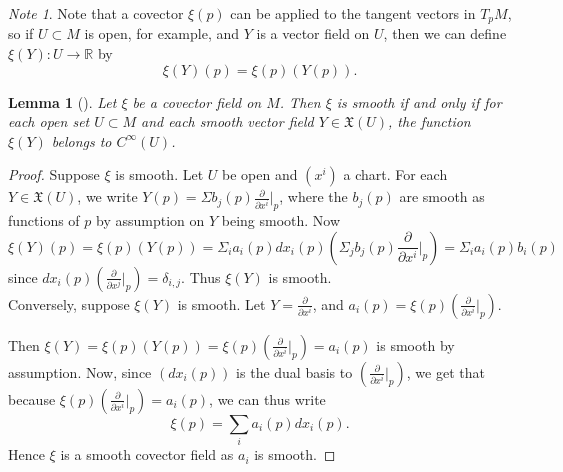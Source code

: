 \documentclass[reqno]{amsart}
\newtheorem{lemma}[theorem]{Lemma}
\theoremstyle{definition}
\theoremstyle{remark}
\newtheorem*{note}{Note}
\begin{document}
      \begin{note}
          Note that a covector $\xi(p)$ can be applied to
          the tangent vectors in $T_pM$, so
          if $U \subset M$ is open, for example, and
          $Y$ is a vector field on $U$, then
          we can define
          $\xi (Y) \colon U \to \mathbb{R}$ by
          \[
          \xi(Y) (p) = \xi(p) \left( Y(p) \right) .
          \] 
      \end{note}

      \begin{lemma}[]
          Let $\xi$ be a covector field on $M$. Then
          $\xi$ is smooth if and only if
          for each open set $U \subset M$ and each smooth
          vector field $Y \in \mathfrak{X}(U)$, the
          function $\xi (Y)$ belongs to $C^{\infty}(U)$.
      \end{lemma}

      \begin{proof}
          Suppose
          $\xi$ is smooth. Let $U$ be open and
          $(x^{i})$ a chart. For each
          $Y \in \mathfrak{X}(U)$, we write
          $Y(p) = \Sigma b_j(p) \frac{\partial}{\partial x^{i}}|_{p}$,
          where the $b_j(p)$ are smooth as functions
          of $p$ by assumption on $Y$ being smooth.
          Now
          \[
          \xi(Y) (p) = 
          \xi(p) \left( Y(p) \right) 
          = \Sigma_i a_i(p) dx_i(p)
          \left( \Sigma_j b_j(p) \frac{\partial}{\partial x^{i}}
          |_{p} \right) =
          \Sigma_i a_i (p) b_i(p)
          \] 
          since
          $dx_i(p) \left( \frac{\partial }{\partial x^{j}}
          |_{p}\right) = \delta_{i,j}$. Thus
          $\xi(Y)$ is smooth.\\

          Conversely, suppose $\xi(Y)$ is smooth. Let
          $Y = \frac{\partial}{\partial x^{i}}$, and
          $a_i(p) = \xi(p) \left( 
          \frac{\partial}{\partial x^{i}}|_p \right) $.

          Then $\xi(Y) =
          \xi (p) \left( Y(p) \right) 
          = \xi(p) \left( \frac{\partial}{\partial x^{i}}|_p
          \right) =
          a_i(p)$ is smooth by assumption.
          Now, since
          $\left( dx_i(p) \right) $ is the dual basis
          to $\left( \frac{\partial}{\partial x^{i}}|_p \right) $,
          we get that because
          $\xi(p) \left( \frac{\partial }{\partial x^{i}}|_p
          \right) = a_i(p)$, we can thus write
          \[
          \xi(p) = \sum_{i} a_i(p) dx_i(p).
          \] 
          Hence $\xi$ is a smooth covector field as
          $a_i$ is smooth.
      \end{proof}
\end{document}
